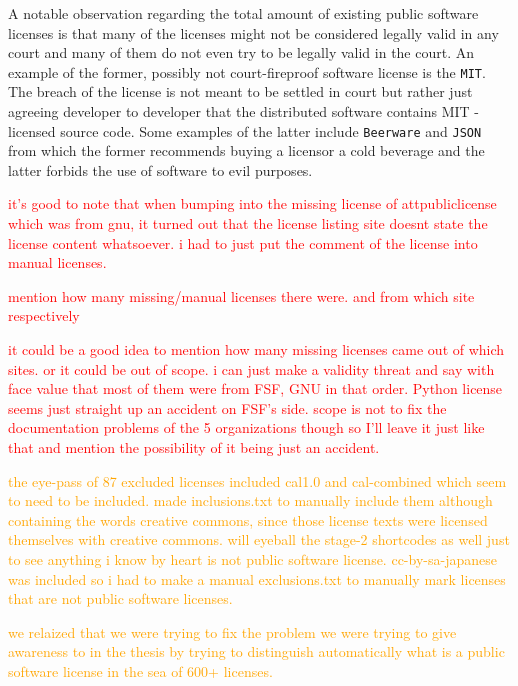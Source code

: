 A notable observation regarding the total amount of existing public software licenses is that many of the licenses might not be considered legally valid in any court and many of them do not even try to be legally valid in the court. An example of the former, possibly not court-fireproof software license is the \texttt{MIT}. The breach of the license is not meant to be settled in court but rather just agreeing developer to developer that the distributed software contains MIT -licensed source code. Some examples of the latter include \texttt{Beerware} and \texttt{JSON} from which the former recommends buying a licensor a cold beverage and the latter forbids the use of software to evil purposes. 


\textcolor{red}{it's good to note that when bumping into the missing license of attpubliclicense which was from gnu, it turned out that the license listing site doesnt state the license content whatsoever. i had to just put the comment of the license into manual licenses.}

\textcolor{red}{mention how many missing/manual licenses there were. and from which site respectively}

\textcolor{red}{it could be a good idea to mention how many missing licenses came out of which sites. or it could be out of scope. i can just make a validity threat and say with face value that most of them were from FSF, GNU in that order. Python license seems just straight up an accident on FSF's side. scope is not to fix the documentation problems of the 5 organizations though so I'll leave it just like that and mention the possibility of it being just an accident.}

\textcolor{orange}{the eye-pass of 87 excluded licenses included cal1.0 and cal-combined which seem to need to be included. made inclusions.txt to manually include them although containing the words creative commons, since those license texts were licensed themselves with creative commons. will eyeball the stage-2 shortcodes as well just to see anything i know by heart is not public software license. cc-by-sa-japanese was included so i had to make a manual exclusions.txt to manually mark licenses that are not public software licenses.}

\textcolor{orange}{we relaized that we were trying to fix the problem we were trying to give awareness to in the thesis by trying to distinguish automatically what is a public software license in the sea of 600+ licenses.}